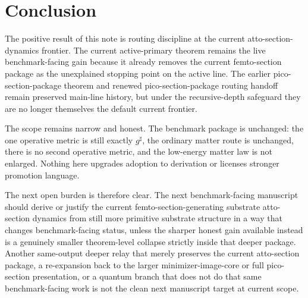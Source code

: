 \documentclass[11pt]{article}
\newcommand{\CompletedMetric}{g^{\sharp}}
\begin{document}
\section{Conclusion}

The positive result of this note is routing discipline at the current atto-section-dynamics frontier. The current active-primary theorem remains the live benchmark-facing gain because it already removes the current femto-section package as the unexplained stopping point on the active line. The earlier pico-section-package theorem and renewed pico-section-package routing handoff remain preserved main-line history, but under the recursive-depth safeguard they are no longer themselves the default current frontier.

The scope remains narrow and honest. The benchmark package is unchanged: the one operative metric is still exactly \(\CompletedMetric\), the ordinary matter route is unchanged, there is no second operative metric, and the low-energy matter law is not enlarged. Nothing here upgrades adoption to derivation or licenses stronger promotion language.

The next open burden is therefore clear. The next benchmark-facing manuscript should derive or justify the current femto-section-generating substrate atto-section dynamics from still more primitive substrate structure in a way that changes benchmark-facing status, unless the sharper honest gain available instead is a genuinely smaller theorem-level collapse strictly inside that deeper package. Another same-output deeper relay that merely preserves the current atto-section package, a re-expansion back to the larger minimizer-image-core or full pico-section presentation, or a quantum branch that does not do that same benchmark-facing work is not the clean next manuscript target at current scope.
\end{document}
